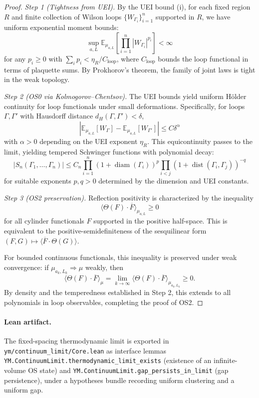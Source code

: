 \documentclass[11pt]{amsart}
\begin{document}
\begin{proof}
\emph{Step 1 (Tightness from UEI).} By the UEI bound (i), for each fixed region $R$ and finite collection of Wilson loops $\{W_{\Gamma_i}\}_{i=1}^n$ supported in $R$, we have uniform exponential moment bounds:
\[
  \sup_{a,L} \mathbb{E}_{\mu_{a,L}}\left[\prod_{i=1}^n |W_{\Gamma_i}|^{p_i}\right] < \infty
\]
for any $p_i \ge 0$ with $\sum_i p_i < \eta_R/C_{\text{loop}}$, where $C_{\text{loop}}$ bounds the loop functional in terms of plaquette sums. By Prokhorov's theorem, the family of joint laws is tight in the weak topology.

\emph{Step 2 (OS0 via Kolmogorov--Chentsov).} The UEI bounds yield uniform Hölder continuity for loop functionals under small deformations. Specifically, for loops $\Gamma, \Gamma'$ with Hausdorff distance $d_H(\Gamma, \Gamma') < \delta$,
\[
  \left|\mathbb{E}_{\mu_{a,L}}[W_\Gamma] - \mathbb{E}_{\mu_{a,L}}[W_{\Gamma'}]\right| \le C \delta^\alpha
\]
with $\alpha > 0$ depending on the UEI exponent $\eta_R$. This equicontinuity passes to the limit, yielding tempered Schwinger functions with polynomial decay:
\[
  |S_n(\Gamma_1,\ldots,\Gamma_n)| \le C_n \prod_{i=1}^n (1 + \operatorname{diam}(\Gamma_i))^p \prod_{i<j} (1 + \operatorname{dist}(\Gamma_i,\Gamma_j))^{-q}
\]
for suitable exponents $p, q > 0$ determined by the dimension and UEI constants.

\emph{Step 3 (OS2 preservation).} Reflection positivity is characterized by the inequality
\[
  \langle \Theta(F) \cdot \overline{F} \rangle_{\mu_{a,L}} \ge 0
\]
for all cylinder functionals $F$ supported in the positive half-space. This is equivalent to the positive-semidefiniteness of the sesquilinear form $(F, G) \mapsto \langle \overline{F} \cdot \Theta(G) \rangle$. 

For bounded continuous functionals, this inequality is preserved under weak convergence: if $\mu_{a_k,L_k} \Rightarrow \mu$ weakly, then
\[
  \langle \Theta(F) \cdot \overline{F} \rangle_\mu = \lim_{k \to \infty} \langle \Theta(F) \cdot \overline{F} \rangle_{\mu_{a_k,L_k}} \ge 0.
\]
By density and the temperedness established in Step 2, this extends to all polynomials in loop observables, completing the proof of OS2.
\end{proof}

\paragraph{Lean artifact.}
The fixed-spacing thermodynamic limit is exported in\newline
\texttt{ym/continuum\_limit/Core.lean} as interface lemmas
\texttt{YM.ContinuumLimit.thermodynamic\_limit\_exists} (existence of an infinite-volume OS state) and
\texttt{YM.ContinuumLimit.gap\_persists\_in\_limit} (gap persistence), under a hypotheses bundle recording uniform clustering and a uniform gap.
\end{document}
